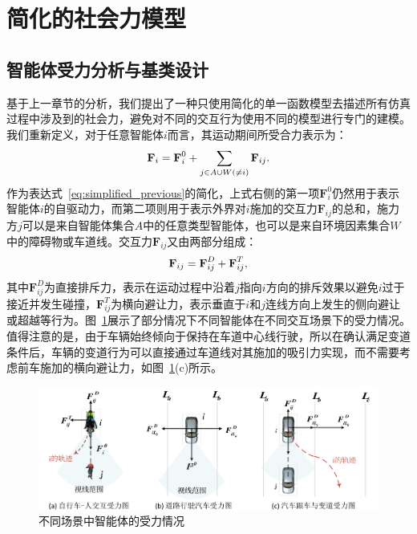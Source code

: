 \section{简化的社会力模型}

\subsection{智能体受力分析与基类设计}
\label{section:simplified_basicclass}

基于上一章节的分析，我们提出了一种只使用简化的单一函数模型去描述所有仿真过程中涉及到的社会力，避免对不同的交互行为使用不同的模型进行专门的建模。我们重新定义，对于任意智能体$i$而言，其运动期间所受合力表示为：
\begin{equation}
\setlength\abovedisplayskip{6pt}
\setlength\belowdisplayskip{6pt}
\label{eq:simplified_newtotalforce}
        \textbf{F}_i = \textbf{F}_i^0 + \sum_{j\in{A\cup{W}}(\not=i)}\textbf{F}_{ij}.
\end{equation}
作为表达式~\ref{eq:simplified_previous}的简化，上式右侧的第一项$\textbf{F}_i^0$仍然用于表示智能体$i$的自驱动力，而第二项则用于表示外界对$i$施加的交互力$\textbf{F}_{ij}$的总和，施力方$j$可以是来自智能体集合$A$中的任意类型智能体，也可以是来自环境因素集合$W$中的障碍物或车道线。交互力$\textbf{F}_{ij}$又由两部分组成：
\begin{equation}
\setlength\abovedisplayskip{6pt}
\setlength\belowdisplayskip{6pt}
\label{eq:simplified_simpforce}
        \textbf{F}_{ij} = \textbf{F}_{ij}^D + \textbf{F}_{ij}^T,
\end{equation}
其中$\textbf{F}_{ij}^D$为直接排斥力，表示在运动过程中沿着$j$指向$i$方向的排斥效果以避免$i$过于接近并发生碰撞，$\textbf{F}_{ij}^T$为横向避让力，表示垂直于$i$和$j$连线方向上发生的侧向避让或超越等行为。图~\ref{fig:simplified_forcediagram}展示了部分情况下不同智能体在不同交互场景下的受力情况。值得注意的是，由于车辆始终倾向于保持在车道中心线行驶，所以在确认满足变道条件后，车辆的变道行为可以直接通过车道线对其施加的吸引力实现，而不需要考虑前车施加的横向避让力，如图~\ref{fig:simplified_forcediagram}(c)所示。


\begin{figure}[t]
\centering
\includegraphics[width=\textwidth]{figure/simplified/simplified_forcediagram_cn_v2.pdf}
\caption[不同场景中智能体的受力情况]{
不同场景中智能体的受力情况
}
\label{fig:simplified_forcediagram}
\end{figure}

